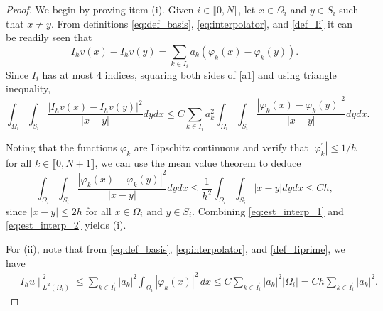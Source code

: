 \documentclass[11 pt]{article}
\newcommand\inter[1]{\llbracket #1\rrbracket}
\numberwithin{equation}{section}
\begin{document}
\begin{proof}
We begin by proving item (i). Given $i\in\inter{0,N}$, let $x\in \Omega_i$ and $y\in S_i$ such that $x\neq y$.  From definitions \eqref{eq:def_basis}, \eqref{eq:interpolator}, and \eqref{def_Ii} it can be readily seen that
%
\begin{equation}\label{a1}
    I_hv(x)-I_hv(y)=\sum_{k\in I_i} a_k(\varphi_k(x)-\varphi_k(y)).
\end{equation}
%
Since $I_i$ has at most 4 indices, squaring both sides of \eqref{a1} and using triangle inequality,
%
\begin{equation}\label{eq:est_interp_1}
    \int_{\Omega_i}\int_{S_i}\frac{|I_hv(x)- I_hv(y)|^2}{|x-y|} dy dx \leq C \sum_{k\in I_i} a_k^2\int_{\Omega_i}\int_{S_i} \frac{|\varphi_k(x)- \varphi_k(y)|^2}{|x-y|} dy dx.
\end{equation}
%

Noting that the functions $\varphi_k$ are Lipschitz continuous and verify that $|\varphi_k^\prime|\leq 1/h$ for all $k\in\inter{0,N+1}$, we can use the mean value theorem to deduce
%
\begin{equation}\label{eq:est_interp_2}
    \int_{\Omega_i}\int_{S_i}\frac{|\varphi_k(x)-\varphi_k(y)|^2}{|x-y|}dy dx \leq \frac{1}{h^2}\int_{\Omega_i}\int_{S_i}|x-y|dy dx \leq Ch,
\end{equation}
%
since $|x-y|\leq 2h$ for all $x\in \Omega_i$ and $y\in S_i$. Combining \eqref{eq:est_interp_1} and \eqref{eq:est_interp_2} yields (i). 

For (ii), note that from \eqref{eq:def_basis}, \eqref{eq:interpolator}, and \eqref{def_Iiprime}, we have
\begin{align*}
\|I_h u\|^2_{L^2(\Omega_i)}
\leq \sum_{k\in I_i^\prime}|a_k|^2\int_{\Omega_i}|\varphi_k(x)|^2\, dx
\leq C\sum_{k\in I_i^\prime}|a_k|^2|\Omega_i|
=Ch\sum_{k\in I_i^\prime}|a_k|^2.
\end{align*}
%
\end{proof}
\end{document}
